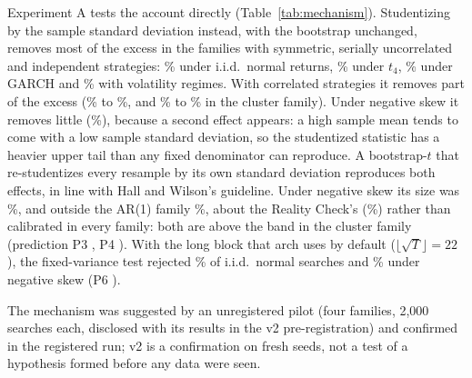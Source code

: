 Experiment A tests the account directly (Table~\ref{tab:mechanism}). Studentizing by the sample standard deviation instead, with the bootstrap unchanged, removes most of the excess in the families with symmetric, serially uncorrelated and independent strategies: \% under i.i.d.\ normal returns, \% under $t_4$, \% under GARCH and \% with volatility regimes. With correlated strategies it removes part of the excess (\% to \%, and \% to \% in the cluster family). Under negative skew it removes little (\%), because a second effect appears: a high sample mean tends to come with a low sample standard deviation, so the studentized statistic has a heavier upper tail than any fixed denominator can reproduce. A bootstrap-$t$ that re-studentizes every resample by its own standard deviation reproduces both effects, in line with Hall and Wilson's guideline. Under negative skew its size was \%, and outside the AR(1) family \%, about the Reality Check's (\%) rather than calibrated in every family: both are above the band in the cluster family (prediction P3 , P4 ). With the long block that arch uses by default ($\lfloor\sqrt{T}\rfloor = 22$), the fixed-variance test rejected \% of i.i.d.\ normal searches and \% under negative skew (P6 ).

The mechanism was suggested by an unregistered pilot (four families, 2,000 searches each, disclosed with its results in the v2 pre-registration) and confirmed in the registered run; v2 is a confirmation on fresh seeds, not a test of a hypothesis formed before any data were seen.

